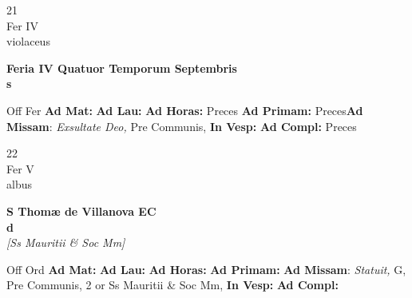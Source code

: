 \documentclass[10pt, openany]{book}
\begin{document}
    \begin{center}
        \begin{minipage}{3.5in}
            \vspace{2em}
            \begin{minipage}{0.5in}
                {\Huge 21} \\
                {\normalsize Fer IV} \\
                {\normalsize violaceus}
            \end{minipage}
            \begin{minipage}{3.0in}
                \textbf{ \large Feria IV Quatuor Temporum Septembris \\
                \textnormal{\normalsize s}} \\ 
            \end{minipage}
            \begin{justify}Off Fer
                \textbf{Ad Mat: }
                \textbf{Ad Lau: }
                \textbf{Ad Horas: }Preces
                \textbf{Ad Primam: }Preces\textbf{Ad Missam}: \textit{Exsultate Deo,} Pre Communis,  
                \textbf{In Vesp: }
                \textbf{Ad Compl: }Preces
            \end{justify}
        \end{minipage}
    \end{center}

    \begin{center}
        \begin{minipage}{3.5in}
            \vspace{2em}
            \begin{minipage}{0.5in}
                {\Huge 22} \\
                {\normalsize Fer V} \\
                {\normalsize albus}
            \end{minipage}
            \begin{minipage}{3.0in}
                \textbf{ \large S Thomæ de Villanova EC \\
                \textnormal{\normalsize d}} \\ \textit{[Ss Mauritii \& Soc Mm]} \\ 
            \end{minipage}
            \begin{justify}Off Ord
                \textbf{Ad Mat: }
                \textbf{Ad Lau: }
                \textbf{Ad Horas: }
                \textbf{Ad Primam: }\textbf{Ad Missam}: \textit{Statuit,} G, Pre Communis, 2 or Ss Mauritii \& Soc Mm,  
                \textbf{In Vesp: }
                \textbf{Ad Compl: }
            \end{justify}
        \end{minipage}
    \end{center}
\end{document}
